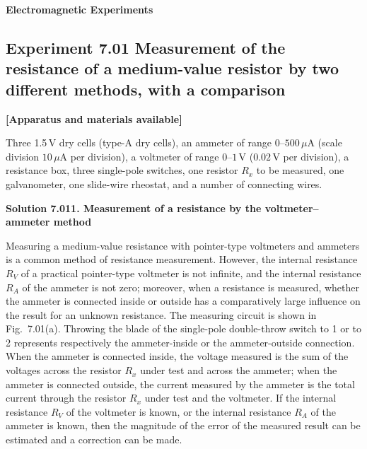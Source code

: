 \begin{center}
{\Large\bfseries Electromagnetic Experiments}
\end{center}

\subsection*{Experiment 7.01 \quad Measurement of the resistance of a medium-value resistor by two different methods, with a comparison}

\textbf{[Apparatus and materials available]}

Three 1.5\,V dry cells (type-A dry cells), an ammeter of range $0$--$500\,\mu$A (scale division $10\,\mu$A per division), a voltmeter of range $0$--$1$\,V ($0.02$\,V per division), a resistance box, three single-pole switches, one resistor $R_x$ to be measured, one galvanometer, one slide-wire rheostat, and a number of connecting wires.

\textbf{Solution 7.01}\quad \textbf{1. Measurement of a resistance by the voltmeter--ammeter method}

Measuring a medium-value resistance with pointer-type voltmeters and ammeters is a common method of resistance measurement. However, the internal resistance $R_V$ of a practical pointer-type voltmeter is not infinite, and the internal resistance $R_A$ of the ammeter is not zero; moreover, when a resistance is measured, whether the ammeter is connected inside or outside has a comparatively large influence on the result for an unknown resistance. The measuring circuit is shown in Fig.~7.01(a). Throwing the blade of the single-pole double-throw switch to 1 or to 2 represents respectively the ammeter-inside or the ammeter-outside connection. When the ammeter is connected inside, the voltage measured is the sum of the voltages across the resistor $R_x$ under test and across the ammeter; when the ammeter is connected outside, the current measured by the ammeter is the total current through the resistor $R_x$ under test and the voltmeter. If the internal resistance $R_V$ of the voltmeter is known, or the internal resistance $R_A$ of the ammeter is known, then the magnitude of the error of the measured result can be estimated and a correction can be made.

